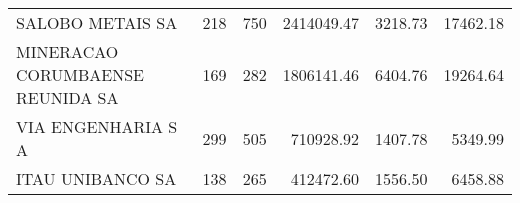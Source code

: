 \begin{tabular}{lrrrrr}
                         SALOBO METAIS SA &                   218 &                  750 &  2414049.47 &    3218.73 &                 17462.18 \\
         MINERACAO CORUMBAENSE REUNIDA SA &                   169 &                  282 &  1806141.46 &    6404.76 &                 19264.64 \\
                       VIA ENGENHARIA S A &                   299 &                  505 &   710928.92 &    1407.78 &                  5349.99 \\
                         ITAU UNIBANCO SA &                   138 &                  265 &   412472.60 &    1556.50 &                  6458.88 \\
\bottomrule
\end{tabular}
